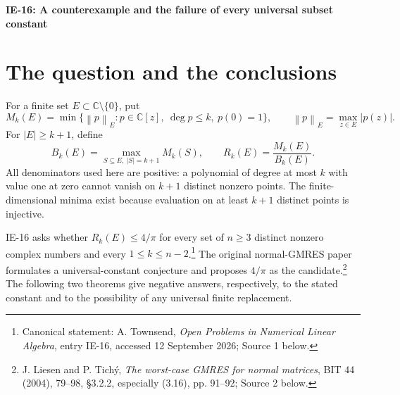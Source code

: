 \documentclass[11pt,a4paper]{article}
\theoremstyle{remark}
\newcommand{\C}{\mathbb C}
\newcommand{\norm}[1]{\left\lVert#1\right\rVert}
\newcommand{\om}{\omega}
\begin{document}
\begin{center}
{\LARGE\bfseries IE-16: A counterexample and the failure of every universal subset constant\par}
\end{center}
\vspace{5pt}

\begin{abstract}
The proposed $4/\pi$ subset bound is false. Let $\om=e^{2\pi i/3}$ and
$L=\{\om^a+10^{-3}\om^b:0\le a,b\le2\}$. At degree $k=4$, this nine-point
set satisfies
\[
 \frac{M_4(L)}{\max_{S\subset L,\ |S|=5}M_4(S)}>\frac{13}{10}>\frac4\pi.
\]
The proof is analytic and covers every subset by its cluster occupancy.
An additional exact-arithmetic certificate checks all 126 subsets and proves
optimality of the full-set polynomial by positive weighted orthogonality.
The actual ratio is approximately $1.33299891979475829424$.
A three-cluster amplification lemma gives a stronger conclusion: no finite
constant, independent of dimension, degree and the points, can satisfy the
proposed type of bound. For every positive integer $r$ and every $\eta>0$,
examples with $n=3^r$ and $k=(3^r-1)/2$ have ratio greater than
$(2/\sqrt3)^r-\eta$.
\end{abstract}

\section{The question and the conclusions}
For a finite set $E\subset\C\setminus\{0\}$, put
\[
 M_k(E)=\min\{\norm{p}_E:p\in\C[z],\ \deg p\le k,\ p(0)=1\},
 \qquad \norm{p}_E=\max_{z\in E}|p(z)|.
\]
For $|E|\ge k+1$, define
\[
 B_k(E)=\max_{S\subseteq E,\ |S|=k+1}M_k(S),
 \qquad R_k(E)=\frac{M_k(E)}{B_k(E)}.
\]
All denominators used here are positive: a polynomial of degree at most $k$
with value one at zero cannot vanish on $k+1$ distinct nonzero points.
The finite-dimensional minima exist because evaluation on at least $k+1$
distinct points is injective.

IE-16 asks whether $R_k(E)\le4/\pi$ for every set of $n\ge3$ distinct nonzero
complex numbers and every $1\le k\le n-2$.\footnote{Canonical statement:
A. Townsend, \emph{Open Problems in Numerical Linear Algebra}, entry IE-16,
accessed 12 September 2026; Source 1 below.}
The original normal-GMRES paper formulates a universal-constant conjecture
and proposes $4/\pi$ as the candidate.\footnote{J. Liesen and P. Tich\'y,
\emph{The worst-case GMRES for normal matrices}, BIT 44 (2004), 79--98,
\S3.2.2, especially (3.16), pp. 91--92; Source 2 below.}
The following two theorems give negative answers, respectively, to the stated
constant and to the possibility of any universal finite replacement.
\end{document}
